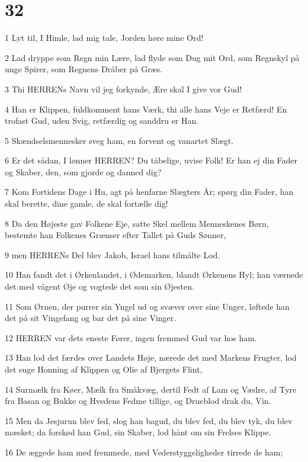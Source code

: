 \chapter{32}

\par 1 Lyt til, I Himle, lad mig tale, Jorden høre mine Ord!
\par 2 Lad dryppe som Regn min Lære, lad flyde som Dug mit Ord, som Regnskyl på unge Spirer, som Regnens Dråber på Græs.
\par 3 Thi HERRENs Navn vil jeg forkynde, Ære skal I give vor Gud!
\par 4 Han er Klippen, fuldkomment hans Værk, thi alle hans Veje er Retfærd! En trofast Gud, uden Svig, retfærdig og sanddru er Han.
\par 5 Skændselsmennesker sveg ham, en forvent og vanartet Slægt.
\par 6 Er det sådan, I lønner HERREN? Du tåbelige, uvise Folk! Er han ej din Fader og Skaber, den, som gjorde og danned dig?
\par 7 Kom Fortidens Dage i Hu, agt på henfarne Slægters År; spørg din Fader, han skal berette, dine gamle, de skal fortælle dig!
\par 8 Da den Højeste gav Folkene Eje, satte Skel mellem Menneskenes Børn, bestemte han Folkenes Grænser efter Tallet på Guds Sønner,
\par 9 men HERRENs Del blev Jakob, Israel hans tilmålte Lod.
\par 10 Han fandt det i Ørkenlandet, i Ødemarken, blandt Ørkenens Hyl; han værnede det med vågent Øje og vogtede det som sin Øjesten.
\par 11 Som Ørnen, der purrer sin Yngel ud og svæver over sine Unger, løftede han det på sit Vingefang og bar det på sine Vinger.
\par 12 HERREN var dets eneste Fører, ingen fremmed Gud var hos ham.
\par 13 Han lod det færdes over Landets Høje, nærede det med Markens Frugter, lod det suge Honning af Klippen og Olie af Bjergets Flint,
\par 14 Surmælk fra Køer, Mælk fra Småkvæg, dertil Fedt af Lam og Vædre, af Tyre fra Basan og Bukke og Hvedens Fedme tillige, og Drueblod drak du, Vin.
\par 15 Men da Jesjurun blev fed, slog han bagud, du blev fed, du blev tyk, du blev mæsket; da forskød han Gud, sin Skaber, lod hånt om sin Frelses Klippe.
\par 16 De æggede ham med fremmede, med Vederstyggeligheder tirrede de ham;
